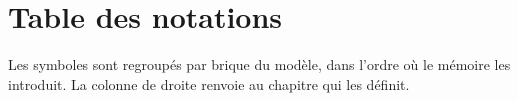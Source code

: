 \chapter{Table des notations}

\label{not:ann:notations}

\noindent Les symboles sont regroupés par brique du modèle, dans l'ordre où le mémoire les
introduit. La colonne de droite renvoie au chapitre qui les définit.

\renewcommand{\arraystretch}{1.22}
